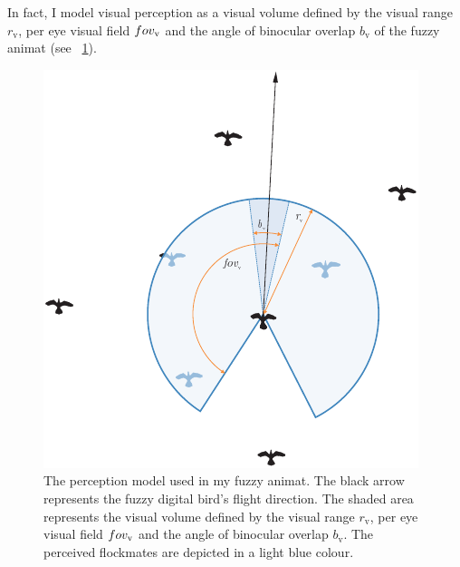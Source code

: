 In fact, I model visual perception as a visual volume defined by the visual range $r_\mathrm{v}$, per eye visual field $fov_\mathrm{v}$ and the angle of binocular overlap $b_\mathrm{v}$ of the fuzzy animat (see \fig~\ref{fig:perception:afd}).
%
\begin{figure}%
\includegraphics{fig[perception]afd}
\caption{The perception model used in my fuzzy animat. The black arrow represents the fuzzy digital bird's flight direction. The shaded area represents the visual volume defined by the visual range $r_\mathrm{v}$, per eye visual field $fov_\mathrm{v}$ and the angle of binocular overlap $b_\mathrm{v}$. The perceived flockmates are depicted in a light blue colour.}
\label{fig:perception:afd}
\end{figure}
%
